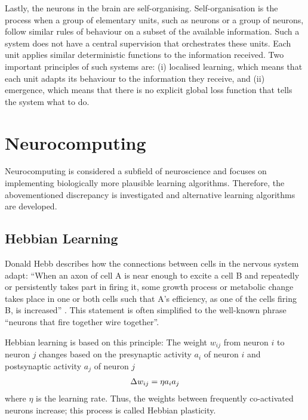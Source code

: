 Lastly, the neurons in the brain are self-organising.
Self-organisation is the process when a group of elementary units, such as neurons or a group of neurons, follow similar rules of behaviour on a subset of the available information.
Such a system does not have a central supervision that orchestrates these units.
Each unit applies similar deterministic functions to the information received.
Two important principles of such systems are: (i) localised learning, which means that each unit adapts its behaviour to the information they receive, and (ii) emergence, which means that there is no explicit global loss function that tells the system what to do.


\section{Neurocomputing}
Neurocomputing is considered a subfield of neuroscience and focuses on implementing biologically more plausible learning algorithms. Therefore, the abovementioned discrepancy is investigated and alternative learning algorithms are developed.

\subsection{Hebbian Learning}
Donald Hebb describes how the connections between cells in the nervous system adapt: ``When an axon of cell A is near enough to excite a cell B and repeatedly or persistently takes part in firing it, some growth process or metabolic change takes place in one or both cells such that A's efficiency, as one of the cells firing B, is increased'' . This statement is often simplified to the well-known phrase ``neurons that fire together wire together''.

Hebbian learning is based on this principle:
The weight $w_{ij}$ from neuron $i$ to neuron $j$ changes based on the presynaptic activity $a_i$ of neuron $i$ and postsynaptic activity $a_j$ of neuron $j$
%
\begin{align}\eqlbl{hebb_1}
	\Delta w_{ij} = \eta a_i a_j
\end{align}
%
where \(\eta\) is the learning rate.
Thus, the weights between frequently co-activated neurons increase; this process is called Hebbian plasticity.

